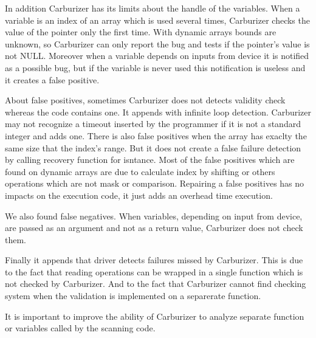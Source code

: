 \documentclass[11pt]{article}
\begin{document}
In addition Carburizer has its limits about the handle of the variables. When a variable is  an index of an array which is used several times, Carburizer checks the value of the pointer only the first time. With dynamic arrays bounds are unknown, so Carburizer can only report the bug and tests if the pointer's value is not NULL. Moreover when a variable depends on inputs from device it is notified as a possible bug, but if the variable is never used this notification is useless and it creates a false positive.

About false positives, sometimes Carburizer does not detects validity check whereas the code contains one. It appends with infinite loop detection. Carburizer may not recognize a timeout inserted by the programmer if it is not a standard integer and adds one. There is also false positives when the array has exaclty the same size that the index's range. But it does not create a false failure detection by calling recovery function for isntance. Most of the false positives which are found on dynamic arrays are due to calculate index by shifting or others operations which are not mask or comparison.
Repairing a false positives has no impacts on the execution code, it just adds an overhead time execution.

We also found false negatives. When variables, depending on input from device, are passed as an argument and not as a return value, Carburizer does not check them. 

Finally it appends that driver detects failures missed by Carburizer. This is due to the fact that reading operations can be wrapped in a single function which is not checked by Carburizer. And to the fact that Carburizer cannot find checking system when the validation is implemented on a separerate function. 

It is important to improve the ability of Carburizer to analyze separate function or variables called by the scanning code.
\end{document}
